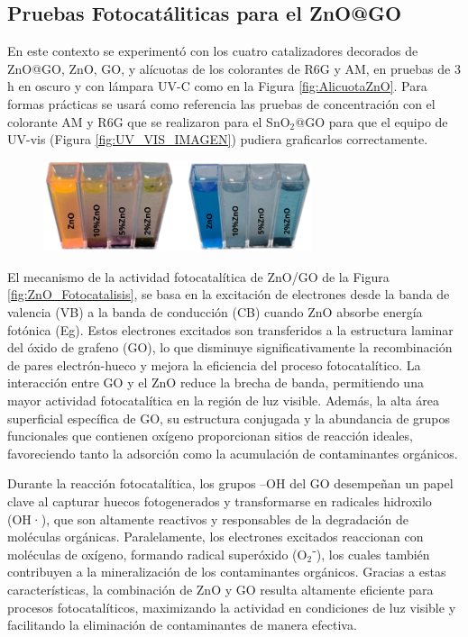 \documentclass[12pt]{article}
\begin{document}
\subsection{Pruebas Fotocatáliticas para el ZnO@GO}
En este contexto se experimentó con los cuatro catalizadores decorados de ZnO@GO, ZnO, GO, y alícuotas de los colorantes de R6G y AM, en pruebas de 3 h en oscuro y con lámpara UV-C como en la Figura \ref{fig:AlicuotaZnO}.
Para formas prácticas se usará como referencia las pruebas de concentración con el colorante AM y R6G que se realizaron para el SnO$\displaystyle _{2}$@GO para que el equipo de UV-vis (Figura \ref{fig:UV_VIS_IMAGEN}) pudiera graficarlos correctamente.
\begin{figure}[H]
    	   \begin{center}
     	  	\includegraphics[width = 0.7\textwidth]{Imagenes/ZnO_FOTO.png}
    	   \end{center} 
        \end{figure}

El mecanismo de la actividad fotocatalítica de ZnO/GO de la Figura \ref{fig:ZnO_Fotocatalisis},  se basa en la excitación de electrones desde la banda de valencia (VB) a la banda de conducción (CB) cuando ZnO absorbe energía fotónica (Eg). Estos electrones excitados son transferidos a la estructura laminar del óxido de grafeno (GO), lo que disminuye significativamente la recombinación de pares electrón-hueco y mejora la eficiencia del proceso fotocatalítico. La interacción entre GO y el ZnO reduce la brecha de banda, permitiendo una mayor actividad fotocatalítica en la región de luz visible. Además, la alta área superficial específica de GO, su estructura conjugada y la abundancia de grupos funcionales que contienen oxígeno proporcionan sitios de reacción ideales, favoreciendo tanto la adsorción como la acumulación de contaminantes orgánicos.\vspace{1em} %

Durante la reacción fotocatalítica, los grupos –OH del GO desempeñan un papel clave al capturar huecos fotogenerados y transformarse en radicales hidroxilo (OH·), que son altamente reactivos y responsables de la degradación de moléculas orgánicas. Paralelamente, los electrones excitados reaccionan con moléculas de oxígeno, formando radical superóxido (O$\displaystyle _{2}$⁻), los cuales también contribuyen a la mineralización de los contaminantes orgánicos. Gracias a estas características, la combinación de ZnO y GO resulta altamente eficiente para procesos fotocatalíticos, maximizando la actividad en condiciones de luz visible y facilitando la eliminación de contaminantes de manera efectiva.
\end{document}

